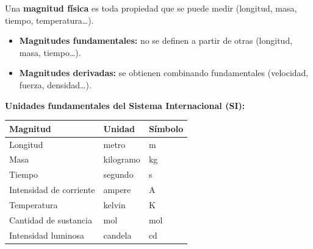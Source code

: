 \documentclass[12pt, letterpaper]{article}
\begin{document}
\begin{cuadroteoria}
  Una \textbf{magnitud física} es toda propiedad que se puede medir (longitud, masa, tiempo, temperatura\ldots).
  \begin{itemize}[leftmargin=*]
    \item \textbf{Magnitudes fundamentales:} no se definen a partir de otras (longitud, masa, tiempo\ldots).
    \item \textbf{Magnitudes derivadas:} se obtienen combinando fundamentales (velocidad, fuerza, densidad\ldots).
  \end{itemize}
\end{cuadroteoria}
\newpage
\begin{cuadroteoria}
  \textbf{Unidades fundamentales del Sistema Internacional (SI):}
  \begin{center}
    \begin{tabular}{lll}
      \toprule
      Magnitud                & Unidad    & Símbolo \\
      \midrule
      Longitud                & metro     & m       \\
      Masa                    & kilogramo & kg      \\
      Tiempo                  & segundo   & s       \\
      Intensidad de corriente & ampere    & A       \\
      Temperatura             & kelvin    & K       \\
      Cantidad de sustancia   & mol       & mol     \\
      Intensidad luminosa     & candela   & cd      \\
      \bottomrule
    \end{tabular}
  \end{center}
\end{cuadroteoria}
\end{document}
